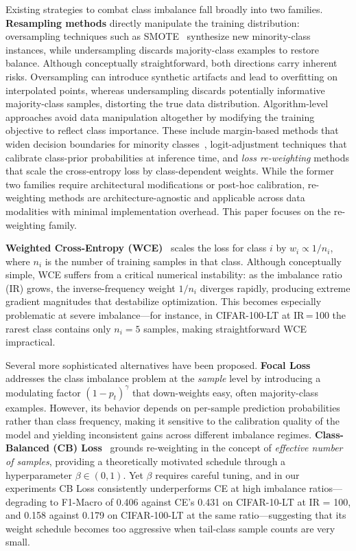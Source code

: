 \documentclass[12pt]{article}
\begin{document}
Existing strategies to combat class imbalance fall broadly into two families.
\textbf{Resampling methods} directly manipulate the training distribution:
oversampling techniques such as SMOTE~\cite{chawla2002} synthesize new minority-class
instances, while undersampling discards majority-class examples to restore balance.
Although conceptually straightforward, both directions carry inherent risks.
Oversampling can introduce synthetic artifacts and lead to overfitting on
interpolated points, whereas undersampling discards potentially informative
majority-class samples, distorting the true data distribution.
Algorithm-level approaches avoid data manipulation altogether by modifying the
training objective to reflect class importance.
These include margin-based methods that widen decision boundaries for minority
classes~\cite{cao2019}, logit-adjustment techniques that calibrate class-prior
probabilities at inference time, and \textit{loss re-weighting} methods that
scale the cross-entropy loss by class-dependent weights.
While the former two families require architectural modifications or post-hoc
calibration, re-weighting methods are architecture-agnostic and applicable across
data modalities with minimal implementation overhead.
This paper focuses on the re-weighting family.

\textbf{Weighted Cross-Entropy (WCE)}~\cite{wang2019} scales the loss for class
$i$ by $w_i \propto 1/n_i$, where $n_i$ is the number of training samples in
that class.
Although conceptually simple, WCE suffers from a critical numerical instability:
as the imbalance ratio (IR) grows, the inverse-frequency weight $1/n_i$ diverges
rapidly, producing extreme gradient magnitudes that destabilize optimization.
This becomes especially problematic at severe imbalance---for instance, in
CIFAR-100-LT at IR\,=\,100 the rarest class contains only $n_i = 5$ samples,
making straightforward WCE impractical.

Several more sophisticated alternatives have been proposed.
\textbf{Focal Loss}~\cite{lin2017} addresses the class imbalance problem at the
\textit{sample} level by introducing a modulating factor $(1-p_t)^\gamma$ that
down-weights easy, often majority-class examples.
However, its behavior depends on per-sample prediction probabilities rather than
class frequency, making it sensitive to the calibration quality of the model and
yielding inconsistent gains across different imbalance regimes.
\textbf{Class-Balanced (CB) Loss}~\cite{cui2019} grounds re-weighting in the
concept of \textit{effective number of samples}, providing a theoretically
motivated schedule through a hyperparameter $\beta \in (0,1)$.
Yet $\beta$ requires careful tuning, and in our experiments CB Loss consistently
underperforms CE at high imbalance ratios---degrading to F1-Macro of 0.406 against
CE's 0.431 on CIFAR-10-LT at IR = 100, and 0.158 against 0.179 on CIFAR-100-LT
at the same ratio---suggesting that its weight schedule becomes too aggressive when
tail-class sample counts are very small.
\end{document}
